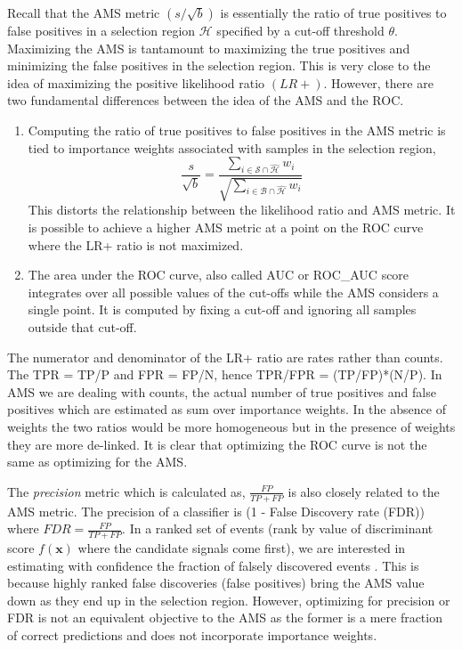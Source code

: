 \documentclass[final,3p,times,twocolumn]{elsarticle}
\begin{document}
Recall that the AMS metric $(s/\sqrt{b})$ is essentially the ratio of true positives to false positives in a selection region $\mathcal{H}$ specified by a cut-off threshold $\theta$. Maximizing the AMS is tantamount to maximizing the true positives and minimizing the false positives in the selection region. This is very close to the idea of maximizing the positive likelihood ratio $(LR+)$. However, there are two fundamental differences between the idea of the AMS and the ROC.

\begin{enumerate}
\item Computing the ratio of true positives to false positives in the AMS metric is tied to importance weights associated with samples in the selection region, 
\begin{displaymath}
\frac{s}{\sqrt{b}} = \frac{\sum_{i \in \mathcal{S}\cap\hat{\mathcal{H}}} w_{i}}{\sqrt{\sum_{i \in \mathcal{B}\cap\hat{\mathcal{H}}} w_{i}}}
\end{displaymath}This distorts the relationship between the likelihood ratio and AMS metric. It is possible to achieve a higher AMS metric at a point on the ROC curve where the LR+ ratio is not maximized.
\item{The area under the ROC curve, also called AUC or ROC\_AUC score integrates over all possible values of the cut-offs while the AMS considers a single point. It is computed by fixing a cut-off and ignoring all samples outside that cut-off.}
\end{enumerate}

The numerator and denominator of the LR+ ratio are rates rather than counts. The TPR = TP/P and FPR = FP/N, hence TPR/FPR = (TP/FP)*(N/P). In AMS we are dealing with counts, the actual number of true positives and false positives which are estimated as sum over importance weights. In the absence of weights the two ratios would be more homogeneous but in the presence of weights they are more de-linked. 
It is clear that optimizing the ROC curve is not the same as optimizing for the AMS. 

The \textit{precision} metric which is calculated as, $\frac{\displaystyle FP}{\displaystyle TP+ FP}$ is also closely related to the AMS metric. The precision of a classifier is (1 - False Discovery rate (FDR)) where $FDR = \frac{\displaystyle FP}{\displaystyle TP+ FP}$. In a ranked set of events (rank by value of discriminant score $f(\textbf{x})$ where the candidate signals come first), we are interested in estimating with confidence the fraction of falsely discovered events \cite{RM}. This is because highly ranked false discoveries (false positives) bring the AMS value down as they end up in the selection region. However, optimizing for precision or FDR is not an equivalent objective to the AMS as the former is a mere fraction of correct predictions and does not incorporate importance weights. 
\end{document}
